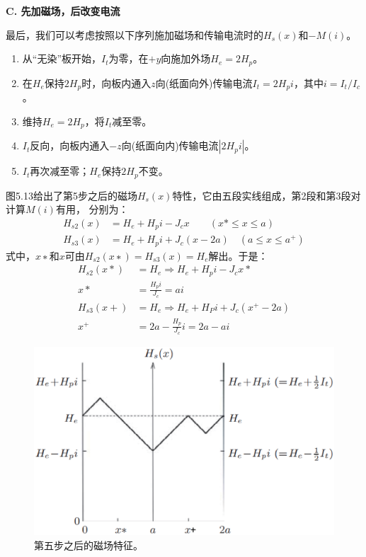 \textbf{C. 先加磁场，后改变电流}

最后，我们可以考虑按照以下序列施加磁场和传输电流时的$H_s(x)$和$−M(i)$。

\begin{enumerate}
	\item 从“无染”板开始，$I_t$为零，在$+y$向施加外场$H_e=2H_p$。
	\item 在$H_e$保持$2H_p$时，向板内通入$z$向(纸面向外)传输电流$I_t=2H_p i$，其中$i=I_t/I_c$。
	\item 维持$H_e=2H_p$，将$I_t$减至零。
	\item $I_t$反向，向板内通入$-z$向(纸面向内)传输电流$|2H_p i|$。
	\item $I_t$再次减至零；$H_e$保持$2H_p$不变。
\end{enumerate}

图5.13给出了第5步之后的磁场$H_s(x)$特性，它由五段实线组成，第2段和第3段对计算$M(i)$有用，
分别为：
\begin{align*}
H_{s2}(x)&=H_{e}+H_{p}i-J_{c}x\qquad(x*\leq x\leq a)\\
H_{s3}(x)&=H_{e}+H_{p}i+J_{c}(x-2a)\quad(a\leq x\leq a^{+})
\end{align*}
式中，$x∗$和$x$可由$H_{s2}(x∗)=H_{s3}(x)=H_e$解出。于是：
\begin{align*}
H_{s2}(x*)&=H_{e}\Rightarrow H_{e}+H_{p}i-J_{c}x*\\
x*&=\frac{H_{p}i}{J_{c}}=ai\\
H_{s3}(x+)&=H_{e}\Rightarrow H_{e}+H_{P}i+J_{c}(x^{+}-2a)\\
x^{+}&=2a-\frac{H_{p}}{J_{c}}i=2a-ai
\end{align*}

\begin{figure}[htbp]
	\centering
	\includegraphics[scale=0.5]{chpt5/figs/fig5.13.eps}
	\caption{第五步之后的磁场特征。}
\end{figure}

